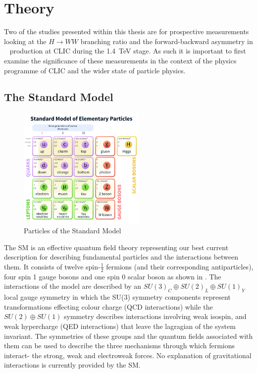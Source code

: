 \chapter{Theory}

Two of the studies presented within this thesis are for prospective measurements looking at the $H\rightarrow WW$ branching ratio and the forward-backward asymmetry in \ttbar~ production at CLIC during the 1.4~TeV stage. As such it is important to first examine the significance of these measurements in the context of the physics programme of CLIC and the wider state of particle physics.


\section{The Standard Model}

\begin{figure}
  \centering
  \includegraphics[width=0.55\textwidth,keepaspectratio]{Theory/fig/smparticles.png}
  \caption[Particles of the Standard Model]{Particles of the Standard Model}
  \label{fig:smparticles}
\end{figure}

The \ac{SM} is an effective quantum field theory representing our best current description for describing fundamental particles and the interactions between them. It consists of twelve spin-$\frac{1}{2}$ fermions (and their corresponding antiparticles), four spin 1 gauge bosons and one spin 0 scalar boson as shown in . The interactions of the model are described by an $SU(3)_{C}\oplus SU(2)_{L}\oplus SU(1)_{Y}$ local gauge symmetry in which the SU(3) symmetry components represent transformations effecting colour charge (\ac{QCD} interactions) while the $SU(2)\oplus SU(1)$ symmetry describes interactions involving weak isospin, and weak hypercharge (\ac{QED} interactions) that leave the lagragian of the system invariant. The symmetries of these groups and the quantum fields associated with them can be used to describe the three mechanisms through which fermions interact- the strong, weak and electroweak forces. No explanation of gravitational interactions is currently provided by the \ac{SM}. 


